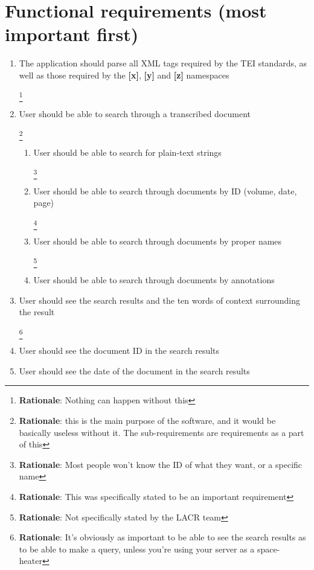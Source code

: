 \documentclass[10pt,a4paper]{report}
\newcommand{\rationale}[1]{
    \footnote{
        \textbf{Rationale}: #1
    }
}
\begin{document}
    \section*{Functional requirements (most important first)}
        \begin{enumerate}
            \item The application should parse all XML tags required by the TEI standards, as well as those required by the \textbf{[x]}, \textbf{[y]} and \textbf{[z]} namespaces
            \rationale{Nothing can happen without this}

            \item User should be able to search through a transcribed document
            \rationale{this is the main purpose of the software, and it would be basically useless without it. The sub-requirements are requirements as a part of this}
                \begin{enumerate}
                    \item User should be able to search for plain-text strings
                    \rationale{Most people won't know the ID of what they want, or a specific name}
                    
                    \item User should be able to search through documents by ID (volume, date, page)
                    \rationale{This was specifically stated to be an important requirement}
                    
                    \item User should be able to search through documents by proper names
                    \rationale{Not specifically stated by the LACR team}
                    
                    \item User should be able to search through documents by  annotations
                \end{enumerate} 
   
            \item User should see the search results and the ten words of context surrounding the result
            \rationale{It's obviously as important to be able to see the search results as to be able to make a query, unless you're using your server as a space-heater}
            
            \item User should see the document ID in the search results
            
            \item User should see the date of the document in the search results
            

\end{enumerate}
\end{document}

